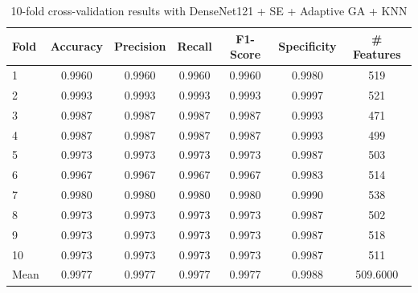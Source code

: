 \begin{table}[htbp]
\centering
\caption{10-fold cross-validation results with DenseNet121 + SE + Adaptive GA + KNN}
\label{tab:table4}
\begin{tabular}{lcccccc}
\toprule
Fold & Accuracy & Precision & Recall & F1-Score & Specificity & \# Features \\
\midrule
1 & 0.9960 & 0.9960 & 0.9960 & 0.9960 & 0.9980 & 519 \\
2 & 0.9993 & 0.9993 & 0.9993 & 0.9993 & 0.9997 & 521 \\
3 & 0.9987 & 0.9987 & 0.9987 & 0.9987 & 0.9993 & 471 \\
4 & 0.9987 & 0.9987 & 0.9987 & 0.9987 & 0.9993 & 499 \\
5 & 0.9973 & 0.9973 & 0.9973 & 0.9973 & 0.9987 & 503 \\
6 & 0.9967 & 0.9967 & 0.9967 & 0.9967 & 0.9983 & 514 \\
7 & 0.9980 & 0.9980 & 0.9980 & 0.9980 & 0.9990 & 538 \\
8 & 0.9973 & 0.9973 & 0.9973 & 0.9973 & 0.9987 & 502 \\
9 & 0.9973 & 0.9973 & 0.9973 & 0.9973 & 0.9987 & 518 \\
10 & 0.9973 & 0.9973 & 0.9973 & 0.9973 & 0.9987 & 511 \\
Mean & 0.9977 & 0.9977 & 0.9977 & 0.9977 & 0.9988 & 509.6000 \\
\bottomrule
\end{tabular}
\end{table}